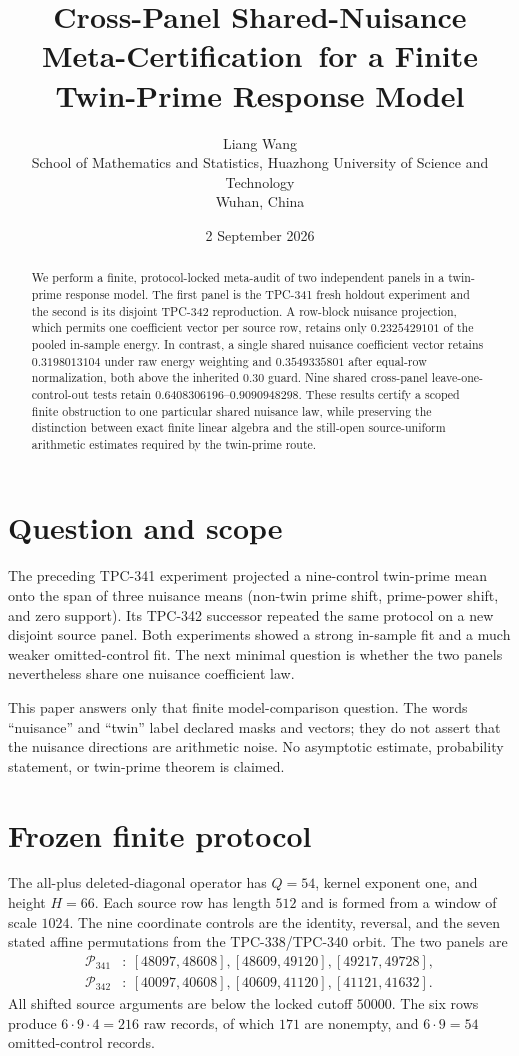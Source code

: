 \documentclass[11pt]{article}
\title{Cross-Panel Shared-Nuisance Meta-Certification\
       for a Finite Twin-Prime Response Model}
\author{Liang Wang\\
School of Mathematics and Statistics, Huazhong University of Science and Technology\\
Wuhan, China}
\date{2 September 2026}
\begin{document}
\maketitle

\begin{abstract}
We perform a finite, protocol-locked meta-audit of two independent panels in a
twin-prime response model.  The first panel is the TPC-341 fresh holdout
experiment and the second is its disjoint TPC-342 reproduction.  A row-block
nuisance projection, which permits one coefficient vector per source row,
retains only $0.2325429101$ of the pooled in-sample energy.  In contrast, a
single shared nuisance coefficient vector retains $0.3198013104$ under raw
energy weighting and $0.3549335801$ after equal-row normalization, both above
the inherited $0.30$ guard.  Nine shared cross-panel leave-one-control-out
tests retain $0.6408306196$--$0.9090948298$.  These results certify a scoped
finite obstruction to one particular shared nuisance law, while preserving
the distinction between exact finite linear algebra and the still-open
source-uniform arithmetic estimates required by the twin-prime route.
\end{abstract}

\section{Question and scope}

The preceding TPC-341 experiment projected a nine-control twin-prime mean onto
the span of three nuisance means (non-twin prime shift, prime-power shift, and
zero support).  Its TPC-342 successor repeated the same protocol on a new
disjoint source panel.  Both experiments showed a strong in-sample fit and a
much weaker omitted-control fit.  The next minimal question is whether the two
panels nevertheless share one nuisance coefficient law.

This paper answers only that finite model-comparison question.  The words
``nuisance'' and ``twin'' label declared masks and vectors; they do not assert
that the nuisance directions are arithmetic noise.  No asymptotic estimate,
probability statement, or twin-prime theorem is claimed.

\section{Frozen finite protocol}

The all-plus deleted-diagonal operator has $Q=54$, kernel exponent one, and
height $H=66$.  Each source row has length $512$ and is formed from a window of
scale $1024$.  The nine coordinate controls are the identity, reversal, and
the seven stated affine permutations from the TPC-338/TPC-340 orbit.  The two
panels are
\begin{align*}
 \mathcal P_{341}&:\ [48097,48608], [48609,49120], [49217,49728],\\
 \mathcal P_{342}&:\ [40097,40608], [40609,41120], [41121,41632].
\end{align*}
All shifted source arguments are below the locked cutoff $50000$.  The six
rows produce $6\cdot9\cdot4=216$ raw records, of which $171$ are nonempty,
and $6\cdot9=54$ omitted-control records.
\end{document}
